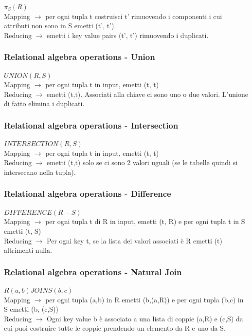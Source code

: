 $\pi_S(R)$ 
\\
Mapping $\rightarrow$ per ogni tupla t costruisci t' rimuovendo i componenti i cui attributi non sono in S emetti (t', t'). 
\\
Reducing $\rightarrow$ emetti i key value pairs (t', t') rimuovendo i duplicati. 

\subsubsection{Relational algebra operations - Union}

$UNION(R, S)$ 
\\
Mapping $\rightarrow$ per ogni tupla t in input, emetti (t, t)
\\
Reducing $\rightarrow$ emetti (t,t). Associati alla chiave ci sono uno o due valori. L'unione di fatto elimina i duplicati.

\subsubsection{Relational algebra operations - Intersection}

$INTERSECTION(R,S)$ 
\\
Mapping $\rightarrow$ per ogni tupla t in input, emetti (t, t)
\\
Reducing $\rightarrow$ emetti (t,t) solo se ci sono 2 valori uguali (se le tabelle quindi si intersecano nella tupla). 

\subsubsection{Relational algebra operations - Difference}

$DIFFERENCE(R-S)$ 
\\
Mapping $\rightarrow$ per ogni tupla t di R in input, emetti (t, R) e per ogni tupla t in S emetti (t, S)
\\
Reducing $\rightarrow$ Per ogni key t, se la lista dei valori associati è R emetti (t) altrimenti nulla.

\subsubsection{Relational algebra operations - Natural Join}

$R(a,b) JOIN S(b,c)$ 
\\
Mapping $\rightarrow$ per ogni tupla (a,b) in R emetti (b,(a,R)) e per ogni tupla (b,c) in S emetti (b, (c,S)) 
\\
Reducing $\rightarrow$ Ogni key value b è associato a una lista di coppie (a,R) e (c,S) da cui puoi costruire tutte le coppie prendendo un elemento da R e uno da S. 

